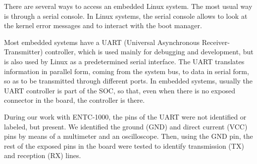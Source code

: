 \documentclass[conference]{IEEEtran}
\newcommand{\nota}[1]{}
\begin{document}
There are several ways to access an embedded Linux system. The most usual way is through a serial console. In Linux systems, the serial console allows to look at the kernel error messages and to interact with the boot manager.

\nota{ La mayoría de los sistemas embebidos contienen un controlador 
UART (del inglés ``Universal Asynchronous Receiver-Transmitter''),
utilizado principalmente para depuración y desarrollo.
Pero que también es utilizado por Linux como la interfaz serie
predeterminada.
El UART traduce la información en formato paralelo
provenientes del bus del sistema, a datos en formato serie,
para que puedan ser transmitidos a través de diferentes puertos.
En los sistemas embebidos, generalmente, el controlador UART es parte de la CPU,
por lo que, aunque no exista un conector expuesto en la placa, generalmente
está presente.
}

Most embedded systems have a UART (Universal Asynchronous Receiver-Transmitter) controller, which is used mainly for debugging and development, but is also used by Linux as a predetermined serial interface. The UART translates information in parallel form, coming from the system bus, to data in serial form, so as to be transmitted through different ports. In embedded systems, usually the UART controller is part of the SOC, so that, even when there is no exposed connector in the board, the controller is there. 

\nota{
En nuestro trabajo con el ENTC-1000, los contactos (en inglés ``pins'') del UART
no se encontraban identificados o etiquetados, pero estaban presentes.
Utilizando un multímetro y un osciloscopio, se identificaron contactos
de tierra (GND) y de voltaje de corriente directa (VCC). Luego, utilizando
el contacto tierra, se probaron los demás contactos expuestos en la placa,
para identificar el contacto de transmisión (TX), y recepción (RX).
}
During our work with ENTC-1000, the pins of the UART were not identified or labeled, but present. We identified the ground (GND) and direct current (VCC) pins by means of a multimeter and an oscilloscope. Then, using the GND pin, the rest of the exposed pins in the board were tested to identify transmission (TX) and reception (RX) lines.
   
\nota {Para corroborar que los contactos del UART son los correctos, se conectó
el conversor de nivel RS-232 a los mismos, y luego a una PC.
Finalmente, se utilizó el programa de comunicaciones minicom para
obtener, al menos, información visual sin sentido, ya que
no se conocía a que velocidad de transmisión se encuentra operando
el firmware original.
}
\end{document}
